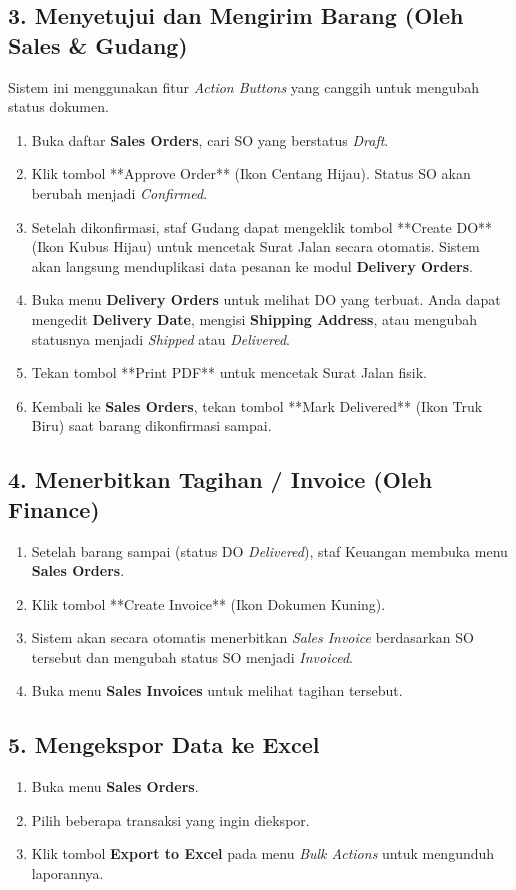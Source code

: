 \subsection{3. Menyetujui dan Mengirim Barang (Oleh Sales \& Gudang)}
Sistem ini menggunakan fitur \textit{Action Buttons} yang canggih untuk mengubah status dokumen.
\begin{enumerate}
    \item Buka daftar \textbf{Sales Orders}, cari SO yang berstatus \textit{Draft}.
    \item Klik tombol **Approve Order** (Ikon Centang Hijau). Status SO akan berubah menjadi \textit{Confirmed}.
    \item Setelah dikonfirmasi, staf Gudang dapat mengeklik tombol **Create DO** (Ikon Kubus Hijau) untuk mencetak Surat Jalan secara otomatis. Sistem akan langsung menduplikasi data pesanan ke modul \textbf{Delivery Orders}.
    \item Buka menu \textbf{Delivery Orders} untuk melihat DO yang terbuat. Anda dapat mengedit \textbf{Delivery Date}, mengisi \textbf{Shipping Address}, atau mengubah statusnya menjadi \textit{Shipped} atau \textit{Delivered}.
    \item Tekan tombol **Print PDF** untuk mencetak Surat Jalan fisik.
    \item Kembali ke \textbf{Sales Orders}, tekan tombol **Mark Delivered** (Ikon Truk Biru) saat barang dikonfirmasi sampai.
\end{enumerate}

\subsection{4. Menerbitkan Tagihan / Invoice (Oleh Finance)}
\begin{enumerate}
    \item Setelah barang sampai (status DO \textit{Delivered}), staf Keuangan membuka menu \textbf{Sales Orders}.
    \item Klik tombol **Create Invoice** (Ikon Dokumen Kuning).
    \item Sistem akan secara otomatis menerbitkan \textit{Sales Invoice} berdasarkan SO tersebut dan mengubah status SO menjadi \textit{Invoiced}.
    \item Buka menu \textbf{Sales Invoices} untuk melihat tagihan tersebut.
\end{enumerate}

\subsection{5. Mengekspor Data ke Excel}
\begin{enumerate}
    \item Buka menu \textbf{Sales Orders}.
    \item Pilih beberapa transaksi yang ingin diekspor.
    \item Klik tombol \textbf{Export to Excel} pada menu \textit{Bulk Actions} untuk mengunduh laporannya.
\end{enumerate}

